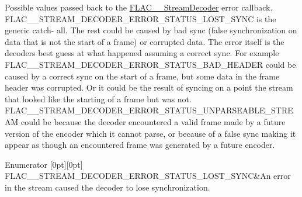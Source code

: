 Possible values passed back to the \mbox{\hyperlink{struct_f_l_a_c_____stream_decoder}{F\+L\+A\+C\+\_\+\+\_\+\+Stream\+Decoder}} error callback. {\ttfamily F\+L\+A\+C\+\_\+\+\_\+\+S\+T\+R\+E\+A\+M\+\_\+\+D\+E\+C\+O\+D\+E\+R\+\_\+\+E\+R\+R\+O\+R\+\_\+\+S\+T\+A\+T\+U\+S\+\_\+\+L\+O\+S\+T\+\_\+\+S\+Y\+NC} is the generic catch-\/ all. The rest could be caused by bad sync (false synchronization on data that is not the start of a frame) or corrupted data. The error itself is the decoder\textquotesingle{}s best guess at what happened assuming a correct sync. For example {\ttfamily F\+L\+A\+C\+\_\+\+\_\+\+S\+T\+R\+E\+A\+M\+\_\+\+D\+E\+C\+O\+D\+E\+R\+\_\+\+E\+R\+R\+O\+R\+\_\+\+S\+T\+A\+T\+U\+S\+\_\+\+B\+A\+D\+\_\+\+H\+E\+A\+D\+ER} could be caused by a correct sync on the start of a frame, but some data in the frame header was corrupted. Or it could be the result of syncing on a point the stream that looked like the starting of a frame but was not. {\ttfamily F\+L\+A\+C\+\_\+\+\_\+\+S\+T\+R\+E\+A\+M\+\_\+\+D\+E\+C\+O\+D\+E\+R\+\_\+\+E\+R\+R\+O\+R\+\_\+\+S\+T\+A\+T\+U\+S\+\_\+\+U\+N\+P\+A\+R\+S\+E\+A\+B\+L\+E\+\_\+\+S\+T\+R\+E\+AM} could be because the decoder encountered a valid frame made by a future version of the encoder which it cannot parse, or because of a false sync making it appear as though an encountered frame was generated by a future encoder. \begin{DoxyEnumFields}{Enumerator}
[0pt][0pt]{}\mbox{\label{group__flac__stream__decoder_gga130e70bd9a73d3c2416247a3e5132ecfa3ceec2a553dc142ad487ae88eb6f7222}} 
F\+L\+A\+C\+\_\+\+\_\+\+S\+T\+R\+E\+A\+M\+\_\+\+D\+E\+C\+O\+D\+E\+R\+\_\+\+E\+R\+R\+O\+R\+\_\+\+S\+T\+A\+T\+U\+S\+\_\+\+L\+O\+S\+T\+\_\+\+S\+Y\+NC&An error in the stream caused the decoder to lose synchronization. \\
\hline


\end{DoxyEnumFields}
